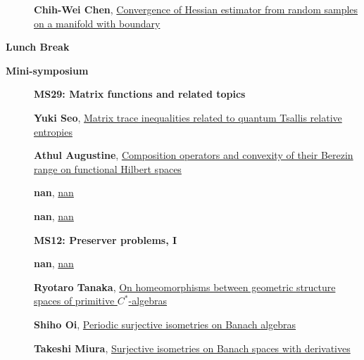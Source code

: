 \documentclass[ILAS2025-program.tex]{subfiles}
\begin{document}
\begin{description}
\begin{description}
        \item[] \hypertarget{up0152}{}\textbf{Chih-Wei Chen}, \hyperlink{down0152}{Convergence of Hessian estimator from random samples on a manifold with boundary}
        \end{description}
    \item[\info{12:00\textrm{--}13:30}] \textbf{Lunch Break} \info{}
    \item[\info{13:30\textrm{--}15:30}] \textbf{Mini-symposium} 
    \begin{description}
    \item[] {\color{mstitle}\textbf{MS29: Matrix functions and related topics}} 
    \item[] \hypertarget{up0157}{}\textbf{Yuki Seo}, \hyperlink{down0157}{Matrix trace inequalities related to quantum Tsallis relative entropies
}
        \item[] \hypertarget{up0158}{}\textbf{Athul Augustine}, \hyperlink{down0158}{Composition operators and convexity of their Berezin range on functional Hilbert spaces}
        \item[] \hypertarget{up0159}{}\textbf{nan}, \hyperlink{down0159}{nan}
        \item[] \hypertarget{up0160}{}\textbf{nan}, \hyperlink{down0160}{nan}
        \end{description}
    \begin{description}
    \item[] {\color{mstitle}\textbf{MS12: Preserver problems, I}} 
    \item[] \hypertarget{up0161}{}\textbf{nan}, \hyperlink{down0161}{nan}
        \item[] \hypertarget{up0162}{}\textbf{Ryotaro Tanaka}, \hyperlink{down0162}{On homeomorphisms between geometric structure spaces of primitive $C^*$-algebras}
        \item[] \hypertarget{up0163}{}\textbf{Shiho Oi}, \hyperlink{down0163}{Periodic surjective isometries on Banach algebras}
        \item[] \hypertarget{up0164}{}\textbf{Takeshi Miura}, \hyperlink{down0164}{Surjective isometries on Banach spaces with derivatives}
        \end{description}
    \begin{description}

\end{description}
\end{description}
\end{document}
